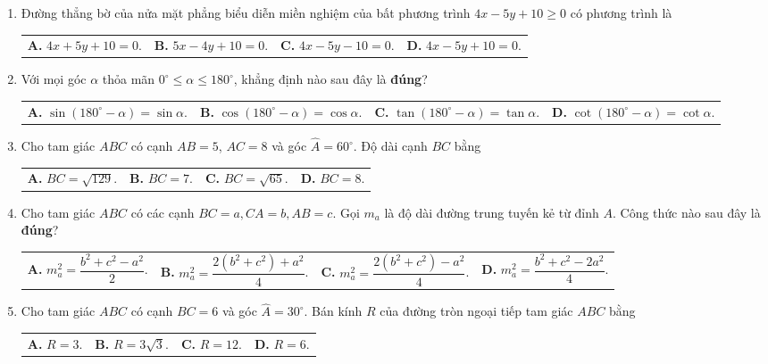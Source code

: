 \documentclass[12pt,a4paper]{article}
\makeatletter
\newcommand{\four}[4]{\par\noindent\begin{tabularx}{\linewidth}{@{}*{4}{>{\raggedright\arraybackslash}X}@{}}\textbf{A.} #1&\textbf{B.} #2&\textbf{C.} #3&\textbf{D.} #4\end{tabularx}}
\makeatother
\begin{document}
\begin{enumerate}
\item Đường thẳng bờ của nửa mặt phẳng biểu diễn miền nghiệm của bất phương trình $4x - 5y + 10 \ge 0$ có phương trình là
\four{$4x + 5y + 10 = 0$.}{$5x - 4y + 10 = 0$.}{$4x - 5y - 10 = 0$.}{$4x - 5y + 10 = 0$.}

\item Với mọi góc $\alpha$ thỏa mãn $0^\circ \le \alpha \le 180^\circ$, khẳng định nào sau đây là \textbf{đúng}?
\four{$\sin(180^\circ - \alpha) = \sin \alpha$.}{$\cos(180^\circ - \alpha) = \cos \alpha$.}{$\tan(180^\circ - \alpha) = \tan \alpha$.}{$\cot(180^\circ - \alpha) = \cot \alpha$.}

\item Cho tam giác $ABC$ có cạnh $AB = 5$, $AC = 8$ và góc $\widehat{A} = 60^\circ$. Độ dài cạnh $BC$ bằng
\four{$BC = \sqrt{129}$.}{$BC = 7$.}{$BC = \sqrt{65}$.}{$BC = 8$.}

\item Cho tam giác $ABC$ có các cạnh $BC = a, CA = b, AB = c$. Gọi $m_a$ là độ dài đường trung tuyến kẻ từ đỉnh $A$. Công thức nào sau đây là \textbf{đúng}?
\four{$m_a^2 = \dfrac{b^2 + c^2 - a^2}{2}$.}{$m_a^2 = \dfrac{2(b^2 + c^2) + a^2}{4}$.}{$m_a^2 = \dfrac{2(b^2 + c^2) - a^2}{4}$.}{$m_a^2 = \dfrac{b^2 + c^2 - 2a^2}{4}$.}

\item Cho tam giác $ABC$ có cạnh $BC = 6$ và góc $\widehat{A} = 30^\circ$. Bán kính $R$ của đường tròn ngoại tiếp tam giác $ABC$ bằng
\four{$R = 3$.}{$R = 3\sqrt{3}$.}{$R = 12$.}{$R = 6$.}
\end{enumerate}
\end{document}
